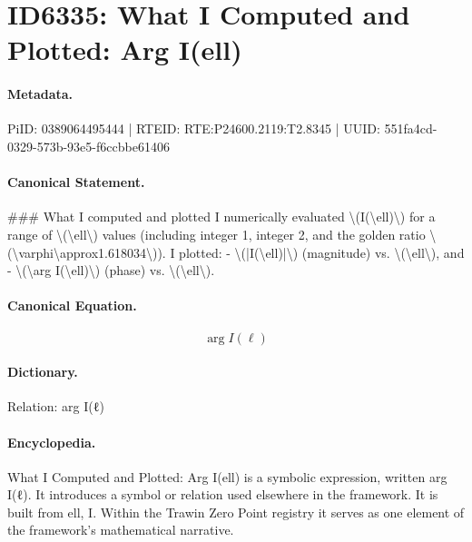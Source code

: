 \section*{ID6335: What I Computed and Plotted: Arg I(ell)}
\paragraph{Metadata.}
PiID: 0389064495444 | RTEID: RTE:P24600.2119:T2.8345 | UUID: 551fa4cd-0329-573b-93e5-f6ccbbe61406

\paragraph{Canonical Statement.}
\#\#\# What I computed and plotted I numerically evaluated \textbackslash{}(I(\textbackslash{}ell)\textbackslash{}) for a range of \textbackslash{}(\textbackslash{}ell\textbackslash{}) values (including integer 1, integer 2, and the golden ratio \textbackslash{}(\textbackslash{}varphi\textbackslash{}approx1.618034\textbackslash{})). I plotted: - \textbackslash{}(|I(\textbackslash{}ell)|\textbackslash{}) (magnitude) vs. \textbackslash{}(\textbackslash{}ell\textbackslash{}), and - \textbackslash{}(\textbackslash{}arg I(\textbackslash{}ell)\textbackslash{}) (phase) vs. \textbackslash{}(\textbackslash{}ell\textbackslash{}).

\paragraph{Canonical Equation.}
\[
\arg I(\ell)
\]

\paragraph{Dictionary.}
Relation: arg I(ℓ)

\paragraph{Encyclopedia.}
What I Computed and Plotted: Arg I(ell) is a symbolic expression, written arg I(ℓ). It introduces a symbol or relation used elsewhere in the framework. It is built from ell, I. Within the Trawin Zero Point registry it serves as one element of the framework's mathematical narrative.
